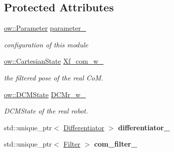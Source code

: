 \subsection*{Protected Attributes}
\begin{DoxyCompactItemize}
\item 
\hyperlink{classow_1_1Parameter}{ow\+::\+Parameter} \hyperlink{classow__com_1_1COMEstimator_a3090d180ae8c7c7498a187e1b00f6267}{parameter\+\_\+}\hypertarget{classow__com_1_1COMEstimator_a3090d180ae8c7c7498a187e1b00f6267}{}\label{classow__com_1_1COMEstimator_a3090d180ae8c7c7498a187e1b00f6267}

\begin{DoxyCompactList}\small\item\em configuration of this module \end{DoxyCompactList}\item 
\hyperlink{classow__core_1_1CartesianState}{ow\+::\+Cartesian\+State} \hyperlink{classow__com_1_1COMEstimator_a07e31590415f70dc7f757601e1caec70}{Xf\+\_\+com\+\_\+w\+\_\+}\hypertarget{classow__com_1_1COMEstimator_a07e31590415f70dc7f757601e1caec70}{}\label{classow__com_1_1COMEstimator_a07e31590415f70dc7f757601e1caec70}

\begin{DoxyCompactList}\small\item\em the filtered pose of the real CoM. \end{DoxyCompactList}\item 
\hyperlink{classow__core_1_1DivergentComponentOfMotionState}{ow\+::\+D\+C\+M\+State} \hyperlink{classow__com_1_1COMEstimator_ab3e1d9c3e12425751e7f7353d99d0fc0}{D\+C\+Mr\+\_\+w\+\_\+}\hypertarget{classow__com_1_1COMEstimator_ab3e1d9c3e12425751e7f7353d99d0fc0}{}\label{classow__com_1_1COMEstimator_ab3e1d9c3e12425751e7f7353d99d0fc0}

\begin{DoxyCompactList}\small\item\em D\+C\+M\+State of the real robot. \end{DoxyCompactList}\item 
std\+::unique\+\_\+ptr$<$ \hyperlink{classow__core_1_1StateDifferentiator}{Differentiator} $>$ {\bfseries differentiator\+\_\+}\hypertarget{classow__com_1_1COMEstimator_a44117298fa41304cd5050e8dd746de03}{}\label{classow__com_1_1COMEstimator_a44117298fa41304cd5050e8dd746de03}

\item 
std\+::unique\+\_\+ptr$<$ \hyperlink{classow__core_1_1MatrixAlgorithm}{Filter} $>$ {\bfseries com\+\_\+filter\+\_\+}\hypertarget{classow__com_1_1COMEstimator_ad5f5fc7d7db6c1de778bf1e20bfa2954}{}\label{classow__com_1_1COMEstimator_ad5f5fc7d7db6c1de778bf1e20bfa2954}

\end{DoxyCompactItemize}


